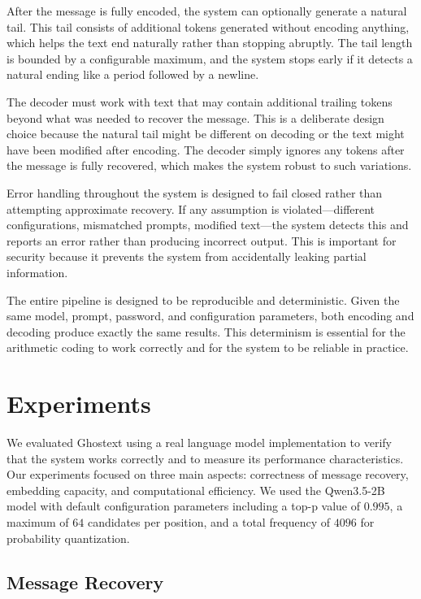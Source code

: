\documentclass[sigconf,review,anonymous]{acmart}
\begin{document}
After the message is fully encoded, the system can optionally generate a natural tail. This tail consists of additional tokens generated without encoding anything, which helps the text end naturally rather than stopping abruptly. The tail length is bounded by a configurable maximum, and the system stops early if it detects a natural ending like a period followed by a newline.

The decoder must work with text that may contain additional trailing tokens beyond what was needed to recover the message. This is a deliberate design choice because the natural tail might be different on decoding or the text might have been modified after encoding. The decoder simply ignores any tokens after the message is fully recovered, which makes the system robust to such variations.

Error handling throughout the system is designed to fail closed rather than attempting approximate recovery. If any assumption is violated---different configurations, mismatched prompts, modified text---the system detects this and reports an error rather than producing incorrect output. This is important for security because it prevents the system from accidentally leaking partial information.

The entire pipeline is designed to be reproducible and deterministic. Given the same model, prompt, password, and configuration parameters, both encoding and decoding produce exactly the same results. This determinism is essential for the arithmetic coding to work correctly and for the system to be reliable in practice.

\section{Experiments}

We evaluated Ghostext using a real language model implementation to verify that the system works correctly and to measure its performance characteristics. Our experiments focused on three main aspects: correctness of message recovery, embedding capacity, and computational efficiency. We used the Qwen3.5-2B model with default configuration parameters including a top-p value of $0.995$, a maximum of $64$ candidates per position, and a total frequency of $4096$ for probability quantization.

\subsection{Message Recovery}
\end{document}
